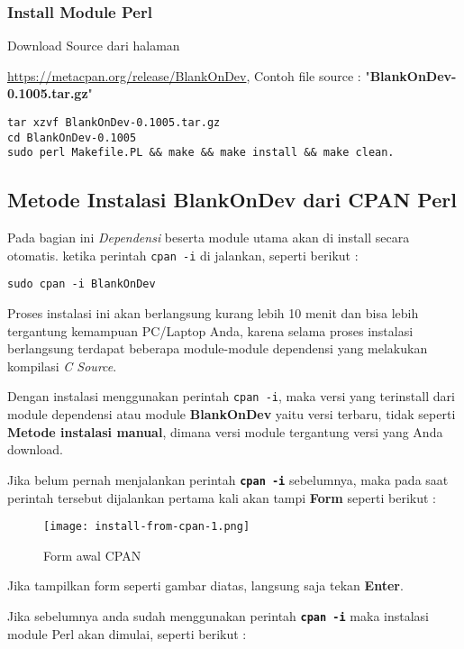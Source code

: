 \subsubsection{Install Module Perl}
\noindent
Download Source dari halaman {\url{https://metacpan.org/release/BlankOnDev}, 
Contoh file source : "\textbf{BlankOnDev-0.1005.tar.gz}"

\begin{lstlisting}[language=ShellBash]
tar xzvf BlankOnDev-0.1005.tar.gz
cd BlankOnDev-0.1005
sudo perl Makefile.PL && make && make install && make clean.
\end{lstlisting}

\subsection{Metode Instalasi BlankOnDev dari CPAN Perl}
\noindent
Pada bagian ini \textit{Dependensi} beserta module utama akan di install secara otomatis. ketika perintah \texttt{cpan -i} di jalankan, seperti berikut :

\begin{lstlisting}[language=ShellBash]
sudo cpan -i BlankOnDev
\end{lstlisting}

\noindent
Proses instalasi ini akan berlangsung kurang lebih 10 menit dan bisa lebih tergantung kemampuan PC/Laptop Anda, karena selama proses instalasi berlangsung terdapat beberapa module-module dependensi yang melakukan kompilasi \textit{C Source}. 

\noindent
Dengan instalasi menggunakan perintah \texttt{cpan -i}, maka versi yang terinstall dari module dependensi atau module \textbf{BlankOnDev} yaitu versi terbaru, tidak seperti \textbf{Metode instalasi manual}, dimana versi module tergantung versi yang Anda download.

\noindent
Jika belum pernah menjalankan perintah \textbf{\texttt{cpan -i}} sebelumnya, maka pada saat perintah tersebut dijalankan pertama kali akan tampi \textbf{Form} seperti berikut :

\begin{figure}[H]
	\centering
	\texttt{[image: install-from-cpan-1.png]}
	\caption{Form awal CPAN}
	\label{fig:bab2_form_awal_cpan}
\end{figure}

\noindent
Jika tampilkan form seperti gambar diatas, langsung saja tekan \textbf{Enter}.

\noindent
Jika sebelumnya anda sudah menggunakan perintah \textbf{\texttt{cpan -i}} maka instalasi module Perl akan dimulai, seperti berikut :

}
